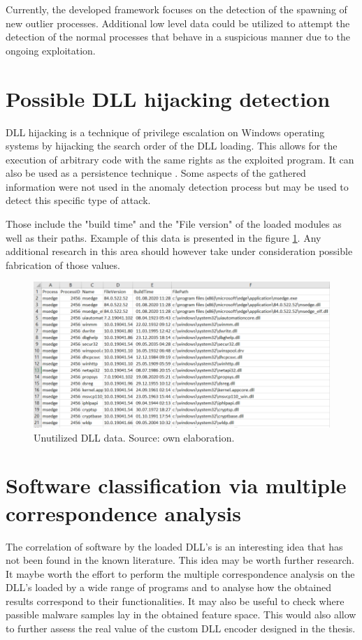 \documentclass[a4paper,twoside,12pt]{book}
\begin{document}
Currently, the developed framework focuses on the detection of the spawning of new outlier processes.
Additional low level data could be utilized to attempt the detection of the normal processes that behave
in a suspicious manner due to the ongoing exploitation.

\section{Possible DLL hijacking detection}

DLL hijacking is a technique of privilege escalation on Windows operating systems by hijacking the 
search order of the DLL loading. This allows for the execution of arbitrary code with the same rights 
as the exploited program. It can also be used as a persistence technique \cite{bib:DLLhijacking}.
Some aspects of the gathered information were not used in the anomaly detection process but may be
used to detect this specific type of attack. 

Those include the "build time" and the "File version" of the loaded modules as well as their paths. 
Example of this data is presented in the figure \ref{fig:exampleDLLData}. Any additional research
in this area should however take under consideration possible fabrication of those values.

\begin{figure}
	\centering
	\includegraphics[scale=0.75]{images/DLLsDataExample}
	\caption{Unutilized DLL data. Source: own elaboration.}
	\label{fig:exampleDLLData}
 \end{figure}

\section{Software classification via multiple correspondence analysis}

The correlation of software by the loaded DLL's is an interesting idea that has not been
found in the known literature. This idea may be worth further research. It maybe worth
the effort to perform the multiple correspondence analysis on the DLL's loaded by a wide range 
of programs and to analyse how the obtained results correspond to their functionalities. It may also
be useful to check where passible malware samples lay in the obtained feature space. This would also
allow to further assess the real value of the custom DLL encoder designed in the thesis. 
\end{document}
